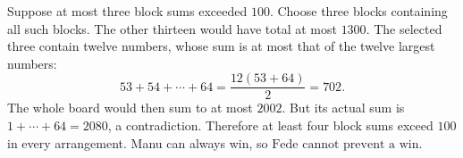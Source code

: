 Suppose at most three block sums exceeded $100$. Choose three blocks containing all such blocks. The other thirteen would have total at most $1300$. The selected three contain twelve numbers, whose sum is at most that of the twelve largest numbers:
\[
53+54+\cdots+64=\dfrac{12(53+64)}{2}=702.
\]
The whole board would then sum to at most $2002$. But its actual sum is $1+\cdots+64=2080$, a contradiction. Therefore at least four block sums exceed $100$ in every arrangement. Manu can always win, so $\boxed{\text{Fede cannot prevent a win}}$.
